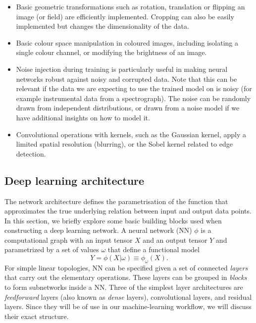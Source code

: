 \begin{itemize}
    \item Basic geometric transformations such as rotation, translation or flipping an image (or field) are efficiently implemented. Cropping can also be easily implemented but changes the dimensionality of the data.
    \item Basic colour space manipulation in coloured images, including isolating a single colour channel, or modifying the brightness of an image.
    \item Noise injection during training is particularly useful in making neural networks robust against noisy and corrupted data. Note that this can be relevant if the data we are expecting to use the trained model on is noisy (for example instrumental data from a spectrograph). The noise can be randomly drawn from independent distributions, or drawn from a noise model if we have additional insights on how to model it.
    \item Convolutional operations with kernels, such as the Gaussian kernel, apply a limited spatial resolution (blurring), or the Sobel kernel related to edge detection.
\end{itemize}


\subsection{Deep learning architecture}\label{sec:deep learning archi}
The network architecture defines the parametrisation of the function that approximates the true underlying relation between input and output data points. In this section, we briefly explore some basic building blocks used when constructing a deep learning network.
A neural network (NN) $\phi$ is a computational graph with an input tensor $X$ and an output tensor $Y$ and parametrized by a set of values $\omega$ that define a functional model
\begin{equation}
    Y=\phi(X|\omega)\equiv \phi_\omega (X).
\end{equation}
For simple linear topologies, NN can be specified given a set of connected \emph{layers} that carry out the elementary operations. These layers can be grouped in \emph{blocks} to form subnetworks inside a NN. Three of the simplest layer architectures are \emph{feedforward} layers (also known as \emph{dense} layers), convolutional layers, and residual layers. Since they will be of use in our machine-learning workflow, we will discuss their exact structure.

